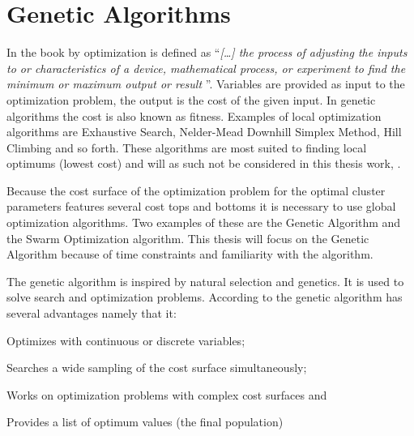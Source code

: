 

\section{Genetic Algorithms}
\label{GeneticAlgorithm}
In the book  by \cite{Haupt2004} optimization is defined as ``\textit{[\dots] the process of adjusting the inputs to or characteristics of a device, mathematical process, or experiment to find the minimum or maximum output or result }''. Variables are provided as input to the optimization problem, the output is the cost of the given input. In genetic algorithms the cost is also known as fitness. Examples of local optimization algorithms are Exhaustive Search, Nelder-Mead Downhill Simplex Method, Hill Climbing and so forth. These algorithms are most suited to finding local optimums (lowest cost) and will as such not be considered in this thesis work, \cite{Haupt2004}.

Because the cost surface of the optimization problem for the optimal \CTC cluster parameters features several cost tops and bottoms it is necessary to use global optimization algorithms. Two examples of these are the Genetic Algorithm and the Swarm Optimization algorithm. This thesis will focus on the Genetic Algorithm because of time constraints and familiarity with the algorithm.

The genetic algorithm is inspired by natural selection and genetics. It is used to solve search and optimization problems. According to \citeauthor[23]{Haupt2004} the genetic algorithm has several advantages namely that it:
\begin{inparaenum}[\itshape 1\upshape)]
\item Optimizes with continuous or discrete variables;
\item Searches a wide sampling of the cost surface simultaneously;
\item Works on optimization problems with complex cost surfaces and
\item Provides a list of optimum values (the final population) 
\end{inparaenum}

